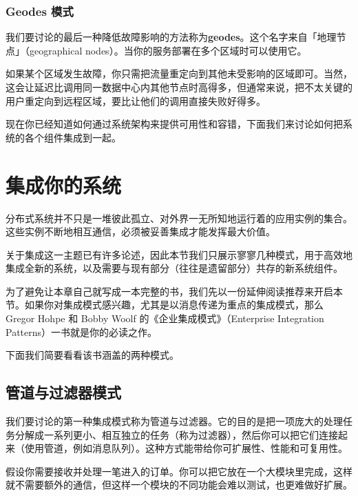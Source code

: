 \subsubsection{Geodes 模式}

\label{idx:352}
\label{idx:353}
我们要讨论的最后一种降低故障影响的方法称为\textbf{geodes}。这个名字来自「地理节点」（geographical nodes）。当你的服务部署在多个区域时可以使用它。

\label{idx:354}
如果某个区域发生故障，你只需把流量重定向到其他未受影响的区域即可。当然，这会让延迟比调用同一数据中心内其他节点时高得多，但通常来说，把不太关键的用户重定向到远程区域，要比让他们的调用直接失败好得多。

现在你已经知道如何通过系统架构来提供可用性和容错，下面我们来讨论如何把系统的各个组件集成到一起。

\section{集成你的系统}

\label{idx:355}
分布式系统并不只是一堆彼此孤立、对外界一无所知地运行着的应用实例的集合。这些实例不断地相互通信，必须被妥善集成才能发挥最大价值。

关于集成这一主题已有许多论述，因此本节我们只展示寥寥几种模式，用于高效地集成全新的系统，以及需要与现有部分（往往是遗留部分）共存的新系统组件。

为了避免让本章自己就写成一本完整的书，我们先以一份延伸阅读推荐来开启本节。如果你对集成模式感兴趣，尤其是以消息传递为重点的集成模式，那么 Gregor Hohpe 和 Bobby Woolf 的《企业集成模式》（Enterprise Integration Patterns）一书就是你的必读之作。

下面我们简要看看该书涵盖的两种模式。

\subsection{管道与过滤器模式}

\label{idx:356}
\label{idx:357}
\label{idx:358}
\label{idx:359}
我们要讨论的第一种集成模式称为管道与过滤器。它的目的是把一项庞大的处理任务分解成一系列更小、相互独立的任务（称为过滤器），然后你可以把它们连接起来（使用管道，例如消息队列）。这种方式能带给你可扩展性、性能和可复用性。


假设你需要接收并处理一笔进入的订单。你可以把它放在一个大模块里完成，这样就不需要额外的通信，但这样一个模块的不同功能会难以测试，也更难做好扩展。

